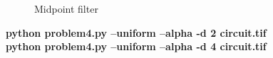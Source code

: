 \begin{figure}[!htb]\centering
    \begin{minipage}{0.45\textwidth}
        \caption{\small{Midpoint filter}}\label{diagram:uniform_midpoint}
    \end{minipage}
\end{figure}


\pagebreak
\begin{minipage}{\textwidth}
\textbf{python problem4.py --uniform --alpha -d 2 circuit.tif} \\
\textbf{python problem4.py --uniform --alpha -d 4 circuit.tif} \\
\end{minipage}


